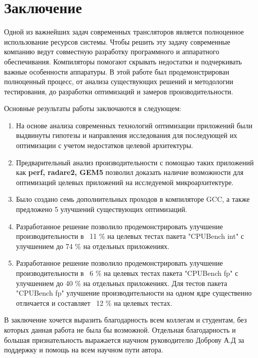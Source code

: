 \chapter*{Заключение}                       %

Одной из важнейших задач современных трансляторов является полноценное использование ресурсов системы. Чтобы решить эту задачу современные компанию ведут совместную разработку программного и аппаратного обеспечивания. Компиляторы помогают скрывать недостатки и подчеркивать важные особенности аппаратуры. В этой работе был продемонстрирован полноценный процесс, от анализа существующих решений и методологии тестирования, до разработки оптимизаций и замеров производительности. 

Основные результаты работы заключаются в следующем:
\begin{enumerate}
	\item На основе анализа современных технологий оптимизации приложений были выдвинуты гипотезы и направления исследования для последующей их оптимизации с учетом недостатков целевой архитектуры.
	\item Предварительный анализ производительности с помощью таких приложений как \textbf{perf, radare2, GEM5} позволил доказать наличие возможности  для оптимизаций целевых приложений на исследуемой микроархитектуре. 
	\item Было создано семь дополнительных  проходов в компиляторе GCC, а также предложено 5 улучшений существующих оптимизаций.
	\item Разработанное решение позволило продемонстрировать улучшение производительности в ~11 \% на целевых тестах пакета "CPUBench int"\phantom{}  с улучшением до 74 \% на отдельных приложениях. 
	\item Разработанное решение позволило продемонстрировать улучшение производительности в ~6 \% на целевых тестах пакета "CPUBench fp"\phantom{}  с улучшением до 40 \% на отдельных приложениях. Для тестов пакета "CPUBench fp"\phantom{} улучшение производительности на  одном ядре существенно отличается и составляет ~12 \% на целевых тестах.
\end{enumerate}

В заключение хочется выразить благодарность всем коллегам и студентам, без которых данная работа не была бы возможной. Отдельная благодарность и большая признательность выражается научном руководителю Доброву А.Д за поддержку и помощь на всем научном пути автора.
